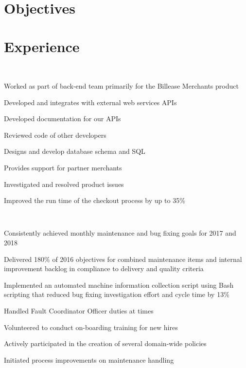 \documentclass[top=0in]{deedy-resume-openfont}
\begin{document}
\hfill
\begin{minipage}[t]{0.66\textwidth} 


\section{Objectives}
\sectionsep

\section{Experience}

\\
\vspace{\topsep} %
\begin{tightemize}
    \item Worked as part of back-end team primarily for the Billease Merchants product
    \item Developed and integrates with external web services APIs
    \item Developed documentation for our APIs
    \item Reviewed code of other developers
    \item Designs and develop database schema and SQL
    \item Provides support for partner merchants
    \item Investigated and resolved product issues
    \item Improved the run time of the checkout process by up to 35\% 
\end{tightemize}
\sectionsep

\\
\begin{tightemize}
    \item Consistently achieved monthly maintenance and bug fixing goals for 2017 and 2018 
    \item Delivered 180\% of 2016 objectives for combined maintenance items and internal improvement backlog in compliance to delivery and quality criteria
    \item Implemented an automated machine information collection script using Bash scripting that reduced bug fixing investigation effort and cycle time by 13\% 
    \item Handled Fault Coordinator Officer duties at times 
    \item Volunteered to conduct on-boarding training for new hires 
    \item Actively participated in the creation of several domain-wide policies 
    \item Initiated process improvements on maintenance handling  
\end{tightemize}
\sectionsep


\end{minipage}
\end{document}
